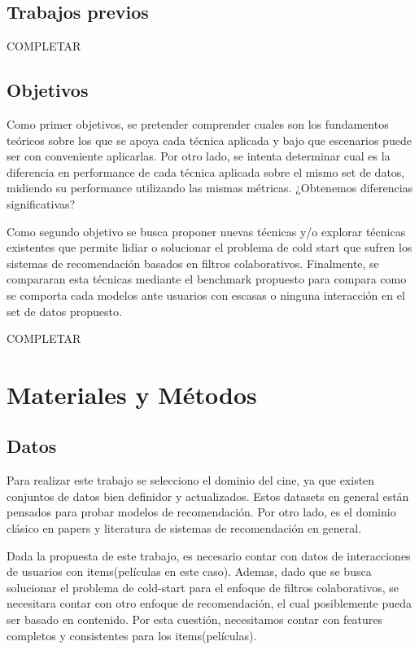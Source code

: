 \documentclass[11pt,a4paper,twoside]{thesis}
\begin{document}
\section{Trabajos previos}

COMPLETAR

\section{Objetivos}

Como primer objetivos, se pretender comprender cuales son los fundamentos teóricos sobre los que se apoya cada técnica aplicada y bajo que escenarios puede ser con conveniente aplicarlas. Por otro lado, se intenta determinar cual es la diferencia en performance de cada técnica aplicada sobre el mismo set de datos, midiendo su performance utilizando las mismas métricas. ¿Obtenemos diferencias significativas?

Como segundo objetivo se busca proponer nuevas técnicas y/o explorar técnicas existentes que permite lidiar o solucionar el problema de cold start que sufren los sistemas de recomendación basados en filtros colaborativos. Finalmente, se compararan esta técnicas mediante el benchmark propuesto para compara como se comporta cada modelos ante usuarios con escasas o ninguna interacción en el set de datos propuesto.

COMPLETAR

\chapter{Materiales y Métodos}

\section{Datos} 

Para realizar este trabajo se selecciono el dominio del cine, ya que existen conjuntos de datos bien definidor y actualizados. 
Estos datasets en general están pensados para probar modelos de recomendación. Por otro lado, es el dominio clásico en papers 
y literatura de sistemas de recomendación en general.

Dada la propuesta de este trabajo, es necesario contar con datos de interacciones de usuarios con items(películas en este caso). 
Ademas, dado que se busca solucionar el problema de cold-start para el enfoque de filtros colaborativos, se necesitara contar 
con otro enfoque de recomendación, el cual posiblemente pueda ser basado en contenido. Por esta cuestión, necesitamos contar 
con features completos y consistentes para los items(películas).
\end{document}
